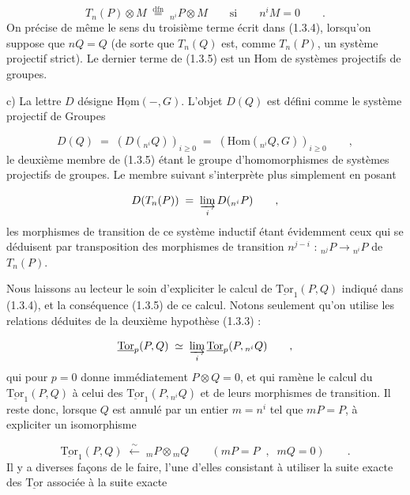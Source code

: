 \begin{equation*}
T_n(P) \otimes M \;\overset{\mathrm{dfn}}{=}\; {}_{n^i}P \otimes M \qquad \text{si} \qquad n^i M = 0 \qquad .
\end{equation*}
On précise de même le sens du troisième terme écrit dans (1.3.4), lorsqu'on suppose que $nQ = Q$ (de sorte que $T_n(Q)$ est, comme $T_n(P)$, un système projectif strict). Le dernier terme de (1.3.5) est un $\mathrm{Hom}$ de systèmes projectifs de groupes.

c)  La lettre $D$ désigne $\underline{\mathrm{Hom}}(-,G)$. L'objet $D(Q)$ est défini comme le système projectif de Groupes

\begin{equation*}
D(Q) \;=\; (D({}_{n^i}Q))_{i \geq 0} \;=\; (\mathrm{Hom}({}_{n^i}Q,G))_{i \geq 0} \qquad ,
\end{equation*}
le deuxième membre de (1.3.5) étant le groupe d'homomorphismes de systèmes projectifs de groupes. Le membre suivant s'interprète plus simplement en posant

\begin{equation*}
D(T_n(P)) \;=\; \varinjlim_i D({}_{n^i}P) \qquad ,
\end{equation*}
les morphismes de transition de ce système inductif étant évidemment ceux qui se déduisent par transposition des morphismes de transition
$n^{j-i}$ : ${}_{n^j}P \longrightarrow {}_{n^i}P$ de $T_n(P)$.

Nous laissons au lecteur le soin d'expliciter le calcul de $\underline{\mathrm{Tor}}_1(P,Q)$ indiqué dans (1.3.4), et la conséquence (1.3.5) de ce calcul. Notons seulement qu'on utilise les relations déduites de la deuxième hypothèse (1.3.3) :

\begin{equation*}
\underline{\mathrm{Tor}}_p(P,Q) \;\simeq\; \varinjlim_{i} \underline{\mathrm{Tor}}_p(P, {}_{n^i}Q) \qquad ,
\end{equation*}
qui pour $p=0$ donne immédiatement $P \otimes Q = 0$, et qui ramène le calcul du $\underline{\mathrm{Tor}}_1(P,Q)$ à celui des $\underline{\mathrm{Tor}}_1(P, {}_{n^i}Q)$ et de leurs morphismes de transition. Il reste donc, lorsque $Q$ est annulé par un entier $m = n^i$ tel que $mP = P$, à expliciter un isomorphisme

\begin{equation}\tag{1.3.6}
\underline{\mathrm{Tor}}_1(P,Q) \;\stackrel{\sim}{\longleftarrow}\; {}_mP \otimes {}_mQ \qquad (mP=P \;\; , \;\; mQ = 0) \qquad .
\end{equation}
Il y a diverses façons de le faire, l'une d'elles consistant à utiliser la suite exacte des $\underline{\mathrm{Tor}}$ associée à la suite exacte

